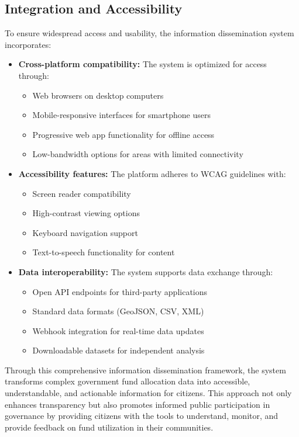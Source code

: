 \documentclass[12pt,a4paper]{report}
\begin{document}
\subsection{Integration and Accessibility}
\indent \indent To ensure widespread access and usability, the information dissemination system incorporates:

\begin{itemize}
    \item \textbf{Cross-platform compatibility:} The system is optimized for access through:
    \begin{itemize}
        \item Web browsers on desktop computers
        \item Mobile-responsive interfaces for smartphone users
        \item Progressive web app functionality for offline access
        \item Low-bandwidth options for areas with limited connectivity
    \end{itemize}
    
    \item \textbf{Accessibility features:} The platform adheres to WCAG guidelines with:
    \begin{itemize}
        \item Screen reader compatibility
        \item High-contrast viewing options
        \item Keyboard navigation support
        \item Text-to-speech functionality for content
    \end{itemize}
    
    \item \textbf{Data interoperability:} The system supports data exchange through:
    \begin{itemize}
        \item Open API endpoints for third-party applications
        \item Standard data formats (GeoJSON, CSV, XML)
        \item Webhook integration for real-time data updates
        \item Downloadable datasets for independent analysis
    \end{itemize}
\end{itemize}

\indent Through this comprehensive information dissemination framework, the system transforms complex government fund allocation data into accessible, understandable, and actionable information for citizens. This approach not only enhances transparency but also promotes informed public participation in governance by providing citizens with the tools to understand, monitor, and provide feedback on fund utilization in their communities.
\end{document}
